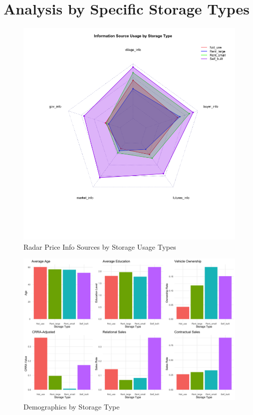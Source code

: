 \documentclass[12pt]{article}
\begin{document}
\newpage
\section{Analysis by Specific Storage Types}



\begin{figure}[H]
\centering
\includegraphics[width=1\textwidth]{figures/radar_storage_info.png}
\caption{Radar Price Info Sources by Storage Usage Types}
\label{Figure: radar}
\end{figure}

\begin{figure}[H]
\centering
\includegraphics[width=1\textwidth]{figures/combined_storage_metrics.png}
\caption{Demographics by Storage Type}
\label{Figure: Demographics by Storage Type}
\end{figure}
\end{document}
